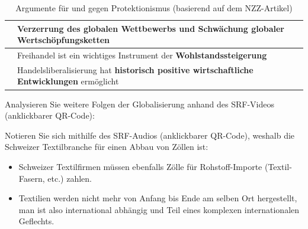 \begin{myexercise}
\begin{myanswer}
\begin{table}[H]
\begin{tabular}{p{6cm}|p{6cm}}
                \midrule
                                                                                                    & \textbf{Verzerrung des globalen Wettbewerbs} und \textbf{Schwächung globaler Wertschöpfungsketten}                                  \\
                \midrule
                                                                                                    & Freihandel ist ein wichtiges Instrument der \textbf{Wohlstandssteigerung}                                                           \\
                \midrule
                                                                                                    & Handelsliberalisierung hat \textbf{historisch positive wirtschaftliche Entwicklungen} ermöglicht                                    \\
            \end{tabular}
            \caption{Argumente für und gegen Protektionismus (basierend auf dem NZZ-Artikel)}
            \label{tab:protektionismus}
        \end{table}
    \end{myanswer}
\end{myexercise}

\begin{mychallenge}
    Analysieren Sie weitere Folgen der Globalisierung anhand des SRF-Videos (anklickbarer QR-Code):

\end{mychallenge}

\begin{myexercise}
    Notieren Sie sich mithilfe des SRF-Audios (anklickbarer QR-Code), weshalb die Schweizer Textilbranche für einen Abbau von Zöllen ist:



    \begin{myanswer}
        \begin{itemize}
            \item Schweizer Textilfirmen müssen ebenfalls Zölle für Rohstoff-Importe (Textil-Fasern, etc.) zahlen.
            \item Textilien werden nicht mehr von Anfang bis Ende am selben Ort hergestellt, man ist also international abhängig und Teil eines komplexen internationalen Geflechts.
        \end{itemize}
    \end{myanswer}
\end{myexercise}

